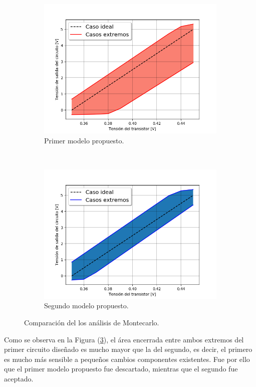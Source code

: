 \documentclass[a4paper]{article}
\begin{document}
\begin{figure}[H]
\centering
\begin{subfigure}{\textwidth}
  \centering
  \includegraphics[width=.8\linewidth]{Ejercicio6/Imagenes/MC-1M.png}
  \caption{Primer modelo propuesto.}
  \label{fig:mcm1}
\end{subfigure}
\\
\begin{subfigure}{\textwidth}
  \centering
  \includegraphics[width=.8\linewidth]{Ejercicio6/Imagenes/MC-2M.png}
  \caption{Segundo modelo propuesto.}
  \label{fig:mcm2}
\end{subfigure}
\caption{Comparación del los análisis de Montecarlo.}
\label{fig:mccomp}
\end{figure}

Como se observa en la Figura (\ref{fig:mccomp}), el área encerrada entre ambos extremos del primer circuito diseñado es mucho mayor que la del segundo, es decir, el primero es mucho más sensible a pequeños cambios componentes existentes. Fue por ello que el primer modelo propuesto fue descartado, mientras que el segundo fue aceptado. 
\end{document}
